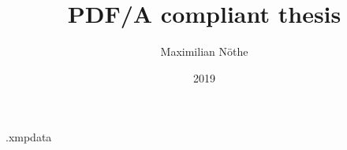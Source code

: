 \RequirePackage{filecontents}
\begin{filecontents*}{\jobname.xmpdata}
\end{filecontents*}
\documentclass[
  BCOR=12mm,
  open=right,
  cleardoublepage=plain,
  bibliography=totoc,
  numbers=noenddot,       %
  captions=tableheading,  %
  titlepage=firstiscover, %
  headings=normal,        %
]{scrbook}




\recalctypearea


\title{PDF/A compliant thesis}
\author{Maximilian Nöthe}
\date{2019}



\frontmatter


\tableofcontents

\mainmatter

\texttt{[image: build/plots/sin.pdf]}

\backmatter
\printbibliography


